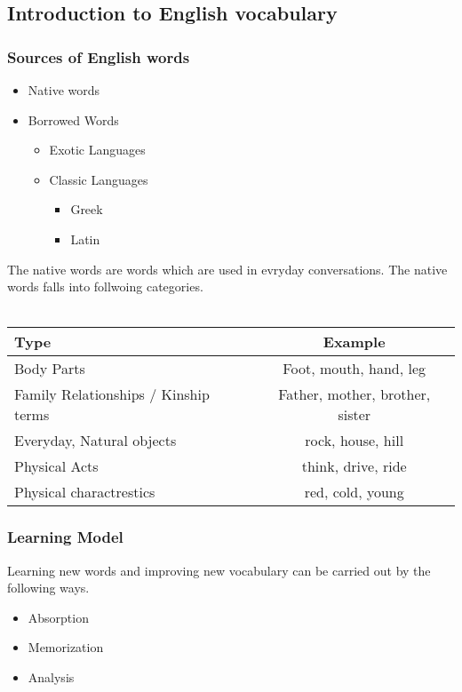 \documentclass[12pt]{article}
\begin{document}
\subsection{Introduction to English vocabulary}
\subsubsection{Sources of English words}
\begin{itemize}
\item Native words
\item Borrowed Words
\begin{itemize}
\item Exotic Languages
\item Classic Languages
\begin{itemize}
\item Greek
\item Latin
\end{itemize}
\end{itemize}
\end{itemize}

The native words are words which are used in evryday conversations. The native words falls into follwoing categories. \\
\\
\begin{tabular}{| l | c | }
	\hline	
		\textbf{Type} & \textbf{Example} \\
		\hline 		\hline
		Body Parts & Foot, mouth, hand, leg \\ \hline
		Family Relationships / Kinship terms & Father, mother, brother, sister \\ \hline
		Everyday, Natural objects &  rock, house, hill \\ \hline
		Physical Acts &  think, drive, ride \\ \hline
		Physical charactrestics  & red, cold, young \\ \hline 
\end{tabular}
\subsubsection{Learning Model}
Learning new words and improving new vocabulary can be carried out by the following ways.
\begin{itemize}
\item Absorption
\item Memorization
\item Analysis
\end{itemize}
\end{document}
